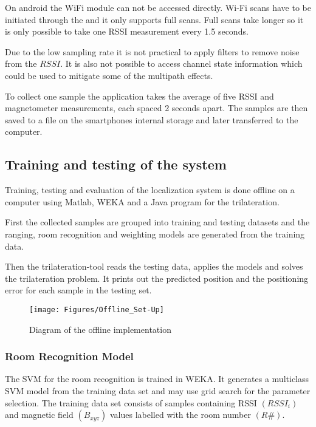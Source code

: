 On android the WiFi module can not be accessed directly. Wi-Fi scans have to be initiated through the  and it only supports full scans\cite{brouwers2014incremental}. Full scans take longer so it is only possible to take one RSSI measurement every 1.5 seconds.

Due to the low sampling rate it is not practical to apply filters to remove noise from the $RSSI$. It is also not possible to access channel state information which could be used to mitigate some of the multipath effects.

To collect one sample the application takes the average of five RSSI and magnetometer measurements, each spaced 2 seconds apart. The samples are then saved to a  file on the smartphones internal storage and later transferred to the computer.

\subsection{Training and testing of the system}

Training, testing and evaluation of the localization system is done offline on a computer using Matlab, WEKA and a Java program for the trilateration.

First the collected samples are grouped into training and testing datasets and the ranging, room recognition and weighting models are generated from the training data.

Then the trilateration-tool reads the testing data, applies the models and solves the trilateration problem. It prints out the predicted position and the positioning error for each sample in the testing set.

\begin{figure}[ht]
\centering
\texttt{[image: Figures/Offline\_Set-Up]}
\decoRule
\caption[Test bed offline implementation]{Diagram of the offline implementation}
\label{fig:offlineImplementation}
\end{figure}

\subsubsection*{Room Recognition Model}
The SVM for the room recognition is trained in WEKA. It generates a multiclass SVM model from the training data set and may use grid search for the parameter selection. The training data set consists of samples containing RSSI \((RSSI_{i})\) and magnetic field \((B_{xyz})\) values labelled with the room number \((R\#)\).

